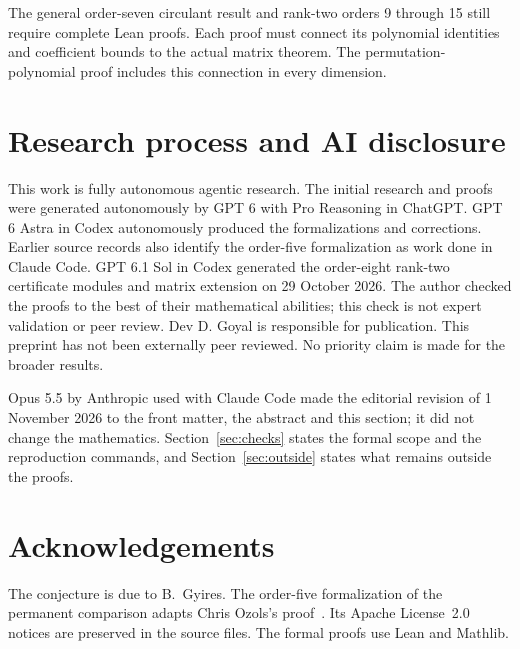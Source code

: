\documentclass[11pt,a4paper]{article}
\theoremstyle{definition}
\theoremstyle{remark}
\begin{document}
The general order-seven circulant result and rank-two orders 9 through 15 still require complete Lean proofs.
Each proof must connect its polynomial identities and coefficient bounds to the actual matrix theorem.
The permutation-polynomial proof includes this connection in every dimension.

\section{Research process and AI disclosure}\label{sec:about}

This work is fully autonomous agentic research. The initial research and proofs were generated autonomously by GPT 6 with Pro Reasoning in ChatGPT. GPT 6 Astra in Codex autonomously produced the formalizations and corrections. Earlier source records also identify the order-five formalization as work done in Claude Code. GPT 6.1 Sol in Codex generated the order-eight rank-two certificate modules and matrix extension on 29 October 2026.
The author checked the proofs to the best of their mathematical abilities; this check is not expert validation or peer review. Dev D. Goyal is responsible for publication.
This preprint has not been externally peer reviewed. No priority claim is made for the broader results.

Opus 5.5 by Anthropic used with Claude Code made the editorial revision of 1 November 2026 to the front matter, the abstract and this section; it did not change the mathematics.
Section~\ref{sec:checks} states the formal scope and the reproduction commands, and Section~\ref{sec:outside} states what remains outside the proofs.

\section*{Acknowledgements}

The conjecture is due to B.~Gyires.
The order-five formalization of the permanent comparison adapts Chris Ozols's proof~\cite{ozols}.
Its Apache License~2.0 notices are preserved in the source files.
The formal proofs use Lean and Mathlib.

\appendix



\begingroup
\small\raggedright


\endgroup
\end{document}
